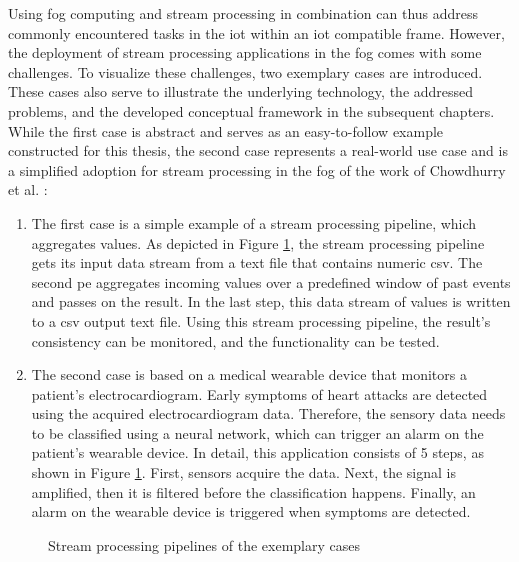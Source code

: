 Using fog computing and stream processing in combination can thus address commonly encountered tasks in the \gls{iot} within an \gls{iot} compatible frame. However, the deployment of stream processing applications in the fog comes with some challenges. To visualize these challenges, two exemplary cases are introduced. These cases also serve to illustrate the underlying technology, the addressed problems, and the developed conceptual framework in the subsequent chapters. While the first case is abstract and serves as an easy-to-follow example constructed for this thesis, the second case represents a real-world use case and is a simplified adoption for stream processing in the fog of the work of Chowdhurry et al. \cite{Chowdhury.2019}:\par

\begin{enumerate}[label=Case \arabic* , wide=0.5em,  leftmargin=*]
    \item \label{cAggregation} The first case is a simple example of a stream processing pipeline, which aggregates values. As depicted in Figure \ref{fExemplaryCases}, the stream processing pipeline gets its input data stream from a text file that contains numeric \gls{csv}. The second \gls{pe} aggregates incoming values over a predefined window of past events and passes on the result. In the last step, this data stream of values is written to a \gls{csv} output text file. Using this stream processing pipeline, the result's consistency can be monitored, and the functionality can be tested.
    \item \label{cMedical} The second case is based on a medical wearable device that monitors a patient’s electrocardiogram. Early symptoms of heart attacks are detected using the acquired electrocardiogram data. Therefore, the sensory data needs to be classified using a neural network, which can trigger an alarm on the patient’s wearable device. In detail, this application consists of 5 steps, as shown in Figure \ref{fExemplaryCases}. First, sensors acquire the data. Next, the signal is amplified, then it is filtered before the classification happens. Finally, an alarm on the wearable device is triggered when symptoms are detected.
\end{enumerate}

\begin{figure}[H]
\graphicspath{{./figures/code/}}

\caption{Stream processing pipelines of the exemplary cases}
\label{fExemplaryCases}
\end{figure}


